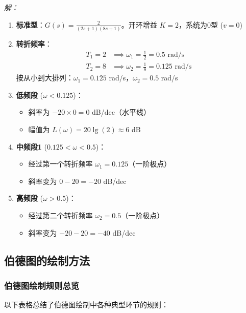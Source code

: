\textit{解：}
\begin{enumerate}
    \item \textbf{标准型}：$G(s) = \frac{2}{(2s+1)(8s+1)}$。开环增益 $K=2$，系统为0型 ($v=0$)
    
    \item \textbf{转折频率}：
    \begin{align*}
    T_1=2 &\implies \omega_1=\frac{1}{2}=0.5 \text{ rad/s} \\
    T_2=8 &\implies \omega_2=\frac{1}{8}=0.125 \text{ rad/s}
    \end{align*}
    按从小到大排列：$\omega_1 = 0.125$ rad/s，$\omega_2 = 0.5$ rad/s
    
    \item \textbf{低频段} ($\omega < 0.125$)：
    \begin{itemize}
        \item 斜率为 $-20 \times 0 = 0$ dB/dec（水平线）
        \item 幅值为 $L(\omega) = 20\lg(2) \approx 6$ dB
    \end{itemize}
    
    \item \textbf{中频段1} ($0.125 < \omega < 0.5$)：
    \begin{itemize}
        \item 经过第一个转折频率 $\omega_1 = 0.125$（一阶极点）
        \item 斜率变为 $0 - 20 = -20$ dB/dec
    \end{itemize}
    
    \item \textbf{高频段} ($\omega > 0.5$)：
    \begin{itemize}
        \item 经过第二个转折频率 $\omega_2 = 0.5$（一阶极点）
        \item 斜率变为 $-20 - 20 = -40$ dB/dec
    \end{itemize}
\end{enumerate}

\subsection{伯德图的绘制方法}

\subsubsection{伯德图绘制规则总览}

以下表格总结了伯德图绘制中各种典型环节的规则：


